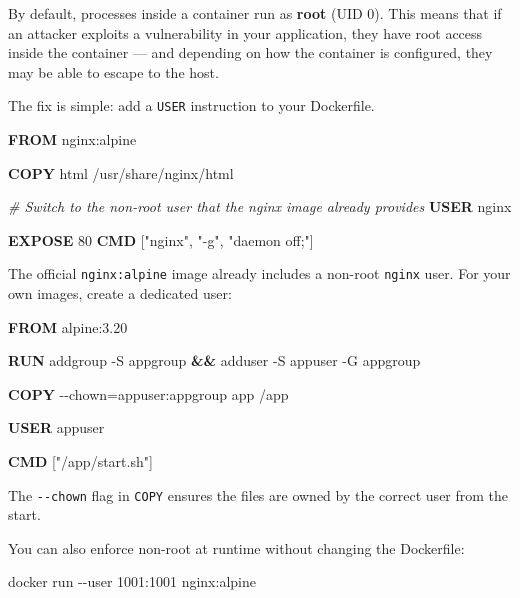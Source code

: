 \documentclass[11pt,american,a4paper,]{book}
\newenvironment{Shaded}{}{}
\newcommand{\AttributeTok}[1]{\textcolor[rgb]{0.49,0.56,0.16}{#1}}
\newcommand{\CommentTok}[1]{\textcolor[rgb]{0.38,0.63,0.69}{\textit{#1}}}
\newcommand{\ExtensionTok}[1]{#1}
\newcommand{\KeywordTok}[1]{\textcolor[rgb]{0.00,0.44,0.13}{\textbf{#1}}}
\newcommand{\NormalTok}[1]{#1}
\newcommand{\OperatorTok}[1]{\textcolor[rgb]{0.40,0.40,0.40}{#1}}
\newcommand{\StringTok}[1]{\textcolor[rgb]{0.25,0.44,0.63}{#1}}
\begin{document}
By default, processes inside a container run as \textbf{root} (UID 0).
This means that if an attacker exploits a vulnerability in your
application, they have root access inside the container --- and
depending on how the container is configured, they may be able to escape
to the host.

The fix is simple: add a \texttt{USER} instruction to your Dockerfile.

\begin{Shaded}
\begin{Highlighting}[]
\KeywordTok{FROM}\NormalTok{ nginx:alpine}

\KeywordTok{COPY}\NormalTok{ html /usr/share/nginx/html}

\CommentTok{\# Switch to the non{-}root user that the nginx image already provides}
\KeywordTok{USER}\NormalTok{ nginx}

\KeywordTok{EXPOSE}\NormalTok{ 80}
\KeywordTok{CMD}\NormalTok{ [}\StringTok{"nginx"}\NormalTok{, }\StringTok{"{-}g"}\NormalTok{, }\StringTok{"daemon off;"}\NormalTok{]}
\end{Highlighting}
\end{Shaded}

The official \texttt{nginx:alpine} image already includes a non-root
\texttt{nginx} user. For your own images, create a dedicated user:

\begin{Shaded}
\begin{Highlighting}[]
\KeywordTok{FROM}\NormalTok{ alpine:3.20}

\KeywordTok{RUN} \ExtensionTok{addgroup} \AttributeTok{{-}S}\NormalTok{ appgroup }\KeywordTok{\&\&} \ExtensionTok{adduser} \AttributeTok{{-}S}\NormalTok{ appuser }\AttributeTok{{-}G}\NormalTok{ appgroup}

\KeywordTok{COPY} \OperatorTok{{-}{-}chown=appuser:appgroup}\NormalTok{ app /app}

\KeywordTok{USER}\NormalTok{ appuser}

\KeywordTok{CMD}\NormalTok{ [}\StringTok{"/app/start.sh"}\NormalTok{]}
\end{Highlighting}
\end{Shaded}

The \texttt{-\/-chown} flag in \texttt{COPY} ensures the files are owned
by the correct user from the start.

You can also enforce non-root at runtime without changing the
Dockerfile:

\begin{Shaded}
\begin{Highlighting}[]
\NormalTok{docker run {-}{-}user 1001:1001 nginx:alpine}
\end{Highlighting}
\end{Shaded}
\end{document}
